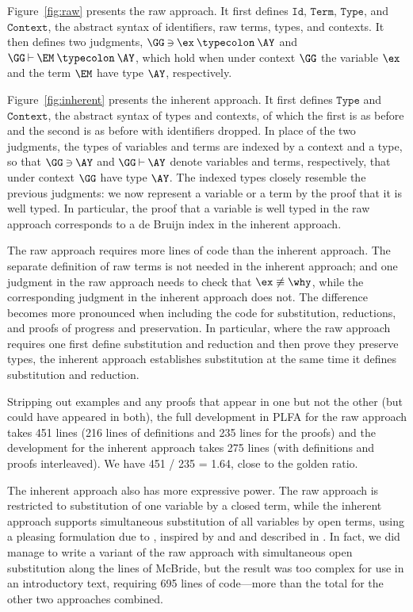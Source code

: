 \documentclass[preprint,authoryear]{elsarticle}
\begin{document}
Figure~\ref{fig:raw} presents the raw approach.
It first defines $\texttt{Id}$, $\texttt{Term}$,
$\texttt{Type}$, and $\texttt{Context}$, the abstract syntax
of identifiers, raw terms, types, and contexts.
It then defines two judgments,
$\GG\:{\ni}\:\ex\:{\typecolon}\:\AY$ and
$\GG\:{\vdash}\:\EM\:{\typecolon}\:\AY$,
which hold when under context $\GG$ the variable $\ex$
and the term $\EM$ have type $\AY$, respectively.

Figure~\ref{fig:inherent} presents the inherent approach.
It first defines $\texttt{Type}$ and $\texttt{Context}$, the abstract syntax
of types and contexts, of which the first is as before and the second is
as before with identifiers dropped.  In place of the two judgments,
the types of variables and terms are indexed by a context and a type,
so that $\GG\:{\ni}\:\AY$ and $\GG\:{\vdash}\:\AY$ denote
variables and terms, respectively, that under context $\GG$ have type $\AY$.
The indexed types closely resemble the previous judgments:
we now represent a variable or a term by the proof that it is well typed.
In particular, the proof that a variable is well typed in the raw approach
corresponds to a de Bruijn index in the inherent approach.

The raw approach requires more lines of code than the inherent approach.  The
separate definition of raw terms is not needed in the inherent approach; and one
judgment in the raw approach needs to check that $\ex \not\equiv \why$, while
the corresponding judgment in the inherent approach does not.  The difference
becomes more pronounced when including the code for substitution, reductions,
and proofs of progress and preservation.  In particular, where the raw approach
requires one first define substitution and reduction and then prove they
preserve types, the inherent approach establishes substitution at the same time
it defines substitution and reduction.

Stripping out examples and any proofs that appear in one but not the other (but
could have appeared in both), the full development in PLFA for the raw approach
takes 451 lines (216 lines of definitions and 235 lines for the proofs) and the
development for the inherent approach takes 275 lines (with definitions and
proofs interleaved).  We have 451 / 235 = 1.64, close to the golden ratio.

The inherent approach also has more expressive power.  The raw
approach is restricted to substitution of one variable by a closed
term, while the inherent approach supports simultaneous substitution
of all variables by open terms, using a pleasing formulation due to
\citet{McBride-2005}, inspired by \citet{Goguen-and-McKinna-1997} and
\citet{Altenkirch-and-Reus-1999} and described in
\citet{Allais-et-al-2017}. In fact, we did manage to write a variant of
the raw approach with simultaneous open substitution along the lines
of McBride, but the result was too complex for use in an introductory
text, requiring 695 lines of code---more than the total for the other
two approaches combined.
\end{document}
